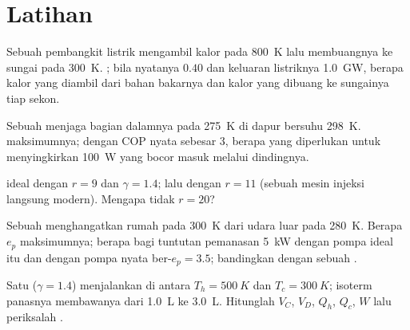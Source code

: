 \section{Latihan}

\begin{exercise}[$\star$]\label{exo:b1:heat-engines:1}
Sebuah pembangkit listrik mengambil kalor pada \qty{800}{K} lalu membuangnya ke sungai pada
\qty{300}{K}. ; bila  nyatanya $0.40$ dan
keluaran listriknya \qty{1.0}{GW}, berapa kalor yang diambil dari bahan bakarnya dan kalor yang
dibuang ke sungainya tiap sekon.
\end{exercise}

\begin{exercise}[$\star$]\label{exo:b1:heat-engines:2}
Sebuah  menjaga bagian dalamnya pada \qty{275}{K} di dapur bersuhu
\qty{298}{K}.  maksimumnya; dengan COP nyata sebesar $3$,
berapa  yang diperlukan untuk menyingkirkan \qty{100}{W} yang bocor masuk melalui
dindingnya.
\end{exercise}

\begin{exercise}[$\star$]\label{exo:b1:heat-engines:3}
 ideal  dengan $r = 9$ dan $\gamma = 1.4$; lalu dengan
$r = 11$ (sebuah mesin injeksi langsung modern). Mengapa tidak $r = 20$?
\end{exercise}

\begin{exercise}[$\star$]\label{exo:b1:heat-engines:4}
Sebuah  menghangatkan rumah pada \qty{300}{K} dari udara luar pada \qty{280}{K}.
Berapa $e_p$ maksimumnya; berapa  bagi tuntutan pemanasan \qty{5}{kW} dengan
pompa ideal itu dan dengan pompa nyata ber-$e_p = 3.5$; bandingkan dengan sebuah
.
\end{exercise}

\begin{exercise}[$\star\star$]\label{exo:b1:heat-engines:5}
Satu   ($\gamma = 1.4$) menjalankan  di antara
$T_h = \qty{500}{K}$ dan $T_c = \qty{300}{K}$; isoterm panasnya membawanya dari
\qty{1.0}{L} ke \qty{3.0}{L}. Hitunglah $V_C$, $V_D$, $Q_h$, $Q_c$, $W$ lalu
periksalah .
\end{exercise}

